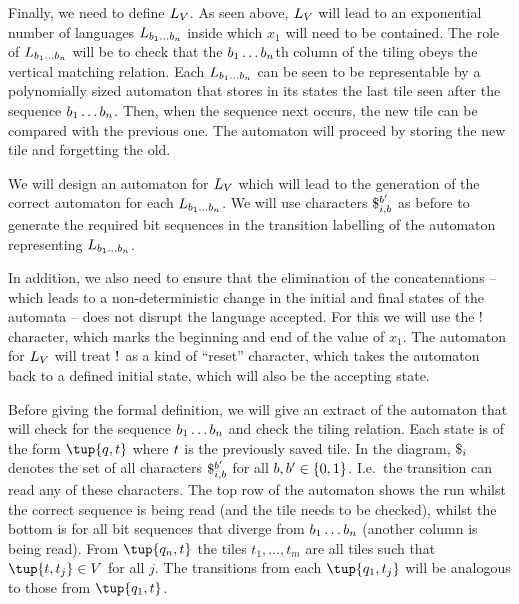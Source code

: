 \documentclass{article}
\begin{document}
Finally, we need to define $L_\vcons$.
As seen above, $L_\vcons$ will lead to an exponential number of languages
$L_{\bit_1\ldots\bit_n}$
inside which $x_1$ will need to be contained.
The role of
$L_{\bit_1\ldots\bit_n}$
will be to check that the
$\bit_1\ldots\bit_n$th
column of the tiling obeys the vertical matching relation.
Each
$L_{\bit_1\ldots\bit_n}$
can be seen to be representable by a polynomially sized automaton that stores in its states the last tile seen after the sequence
$\bit_1\ldots\bit_n$.
Then, when the sequence next occurs, the new tile can be compared with the previous one.
The automaton will proceed by storing the new tile and forgetting the old.

We will design an automaton for $L_\vcons$ which will lead to the generation of the correct automaton for each
$L_{\bit_1\ldots\bit_n}$.
We will use characters
$\repl{i}{\bit}{\bit'}$
as before to generate the required bit sequences in the transition labelling of the automaton representing
$L_{\bit_1\ldots\bit_n}$.

In addition, we also need to ensure that the elimination of the concatenations -- which leads to a non-deterministic change in the initial and final states of the automata -- does not disrupt the language accepted.
For this we will use the $\resetchar$ character, which marks the beginning and end of the value of $x_1$.
The automaton for $L_\vcons$ will treat $\resetchar$ as a kind of ``reset'' character, which takes the automaton back to a defined initial state, which will also be the accepting state.

Before giving the formal definition, we will give an extract of the automaton that will check for the sequence
$\bit_1\ldots\bit_n$
and check the tiling relation.
Each state is of the form $\tup{q, \tile}$ where $\tile$ is the previously saved tile.
In the diagram, $\replall{i}$ denotes the set of all characters
$\repl{i}{\bit}{\bit'}$
for all $\bit, \bit' \in \set{0,1}$.
I.e.\ the transition can read any of these characters.
The top row of the automaton shows the run whilst the correct sequence is being read (and the tile needs to be checked), whilst the bottom is for all bit sequences that diverge from
$\bit_1\ldots\bit_n$
(another column is being read).
From $\tup{q_n, \tile}$ the tiles
$t_1, \ldots, t_m$
are all tiles such that
$\tup{t, t_j} \in \vcons$
for all $j$.
The transitions from each
$\tup{q_1, \tile_j}$
will be analogous to those from
$\tup{q_1, \tile}$.
\end{document}
